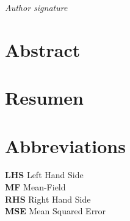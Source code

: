 \documentclass[openany]{article}
\begin{document}
\lipsum[1]

\mbox{}\par
\vspace{0.5cm}

\begin{flushright}
    \textit{Author signature}
\end{flushright}


\clearpage\thispagestyle{empty}\null\newpage %

\newpage
\thispagestyle{plain}

\section*{Abstract}

\vspace{2cm}

\section*{Resumen}

\lipsum[1]

%

\clearpage\thispagestyle{empty}\null\newpage %

\newpage
\thispagestyle{plain}

\section*{Abbreviations}

\textbf{LHS} Left Hand Side \\

\textbf{MF} Mean-Field \\

\textbf{RHS} Right Hand Side \\

\textbf{MSE} Mean Squared Error

\clearpage\thispagestyle{empty}\null\newpage %

\newpage
\thispagestyle{plain}
{
    \tableofcontents
}


\thispagestyle{empty}

\clearpage\thispagestyle{empty}\null\newpage %


\newpage


\newpage


\newpage


\newpage


\newpage


\newpage


\newpage


\newpage


\newpage

\end{document}
